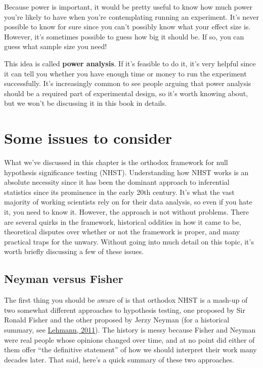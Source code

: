 \documentclass[
]{book}
\theoremstyle{definition}
\theoremstyle{definition}
\theoremstyle{definition}
\theoremstyle{definition}
\theoremstyle{remark}
\begin{document}
Because power is important, it would be pretty useful to know how much power you're likely to have when you're contemplating running an experiment. It's never possible to know for sure since you can't possibly know what your effect size is. However, it's sometimes possible to guess how big it should be. If so, you can guess what sample size you need!

This idea is called \textbf{power analysis}. If it's feasible to do it, it's very helpful since it can tell you whether you have enough time or money to run the experiment successfully. It's increasingly common to see people arguing that power analysis should be a required part of experimental design, so it's worth knowing about, but we won't be discussing it in this book in details.

\hypertarget{nhstmess}{%
\section{Some issues to consider}\label{nhstmess}}

What we've discussed in this chapter is the orthodox framework for null hypothesis significance testing (NHST). Understanding how NHST works is an absolute necessity since it has been the dominant approach to inferential statistics since its prominence in the early 20th century. It's what the vast majority of working scientists rely on for their data analysis, so even if you hate it, you need to know it. However, the approach is not without problems. There are several quirks in the framework, historical oddities in how it came to be, theoretical disputes over whether or not the framework is proper, and many practical traps for the unwary. Without going into much detail on this topic, it's worth briefly discussing a few of these issues.

\hypertarget{neyman-versus-fisher}{%
\subsection{Neyman versus Fisher}\label{neyman-versus-fisher}}

The first thing you should be aware of is that orthodox NHST is a mash-up of two somewhat different approaches to hypothesis testing, one proposed by Sir Ronald Fisher and the other proposed by Jerzy Neyman (for a historical summary, see \protect\hyperlink{ref-Lehmann2011}{Lehmann, 2011}). The history is messy because Fisher and Neyman were real people whose opinions changed over time, and at no point did either of them offer ``the definitive statement'' of how we should interpret their work many decades later. That said, here's a quick summary of these two approaches.
\end{document}
